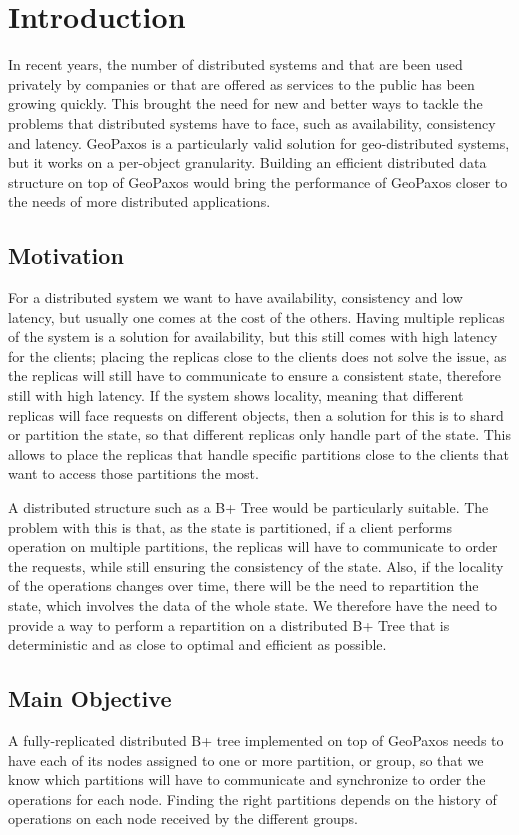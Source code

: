 \chapter{Introduction}\label{sec:introduction}
In recent years, the number of distributed systems and that are been used privately by companies or that are offered as services to the public has been growing quickly. This brought the need for new and better ways to tackle the problems that distributed systems have to face, such as availability, consistency and latency. GeoPaxos is a particularly valid solution for geo-distributed systems, but it works on a per-object granularity. Building an efficient distributed data structure on top of GeoPaxos would bring the performance of GeoPaxos closer to the needs of more distributed applications.


\section{Motivation}\label{sec:motivation}
For a distributed system we want to have availability, consistency and low latency, but usually one comes at the cost of the others. Having multiple replicas of the system is a solution for availability, but this still comes with high latency for the clients; placing the replicas close to the clients does not solve the issue, as the replicas will still have to communicate to ensure a consistent state, therefore still with high latency. If the system shows locality, meaning that different replicas will face requests on different objects, then a solution for this is to shard or partition the state, so that different replicas only handle part of the state. This allows to place the replicas that handle specific partitions close to the clients that want to access those partitions the most.

A distributed structure such as a B+ Tree would be particularly suitable. The problem with this is that, as the state is partitioned, if a client performs operation on multiple partitions, the replicas will have to communicate to order the requests, while still ensuring the consistency of the state. Also, if the locality of the operations changes over time, there will be the need to repartition the state, which involves the data of the whole state. We therefore have the need to provide a way to perform a repartition on a distributed B+ Tree that is deterministic and as close to optimal and efficient as possible.

\section{Main Objective}\label{sec:main-objective}
A fully-replicated distributed B+ tree implemented on top of GeoPaxos needs to have each of its nodes assigned to one or more partition, or group, so that we know which partitions will have to communicate and synchronize to order the operations for each node. Finding the right partitions depends on the history of operations on each node received by the different groups.

